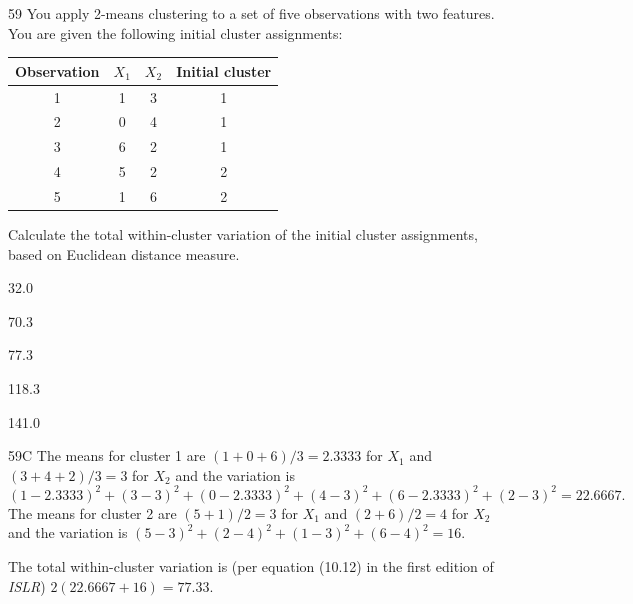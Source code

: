 \begin{question}{59}
You apply 2-means clustering to a set of five observations with two features. You are given the following initial cluster assignments:
\begin{center}
\begin{tabular}{|c|c|c|c|}
\hline
Observation & $X_1$ & $X_2$ & Initial cluster \\ \hline
1 & 1 & 3 & 1 \\ \hline
2 & 0 & 4 & 1 \\ \hline
3 & 6 & 2 & 1 \\ \hline
4 & 5 & 2 & 2 \\ \hline
5 & 1 & 6 & 2 \\ \hline
\end{tabular}
\end{center}

Calculate the total within-cluster variation of the initial cluster assignments, based on Euclidean distance measure.

\begin{choices}
\item 32.0
\item 70.3
\item 77.3
\item 118.3
\item 141.0
\end{choices}
\end{question}
\begin{solution}{59}{C}
The means for cluster 1 are $(1 + 0 + 6)/3 = 2.3333$ for $X_1$ and $(3 + 4 + 2)/3 = 3$ for $X_2$ and the variation is
\[ (1 - 2.3333)^2 + (3-3)^2 + (0 - 2.3333)^2 + (4-3)^2 + (6 - 2.3333)^2 + (2-3)^2 = 22.6667. \]
The means for cluster 2 are $(5 + 1)/2 = 3$ for $X_1$ and $(2 + 6)/2 = 4$ for $X_2$ and the variation is $(5-3)^2 + (2-4)^2 + (1-3)^2 + (6-4)^2 = 16$.

The total within-cluster variation is (per equation (10.12) in the first edition of \textit{ISLR}) $2(22.6667 + 16) = 77.33$.
\end{solution}


